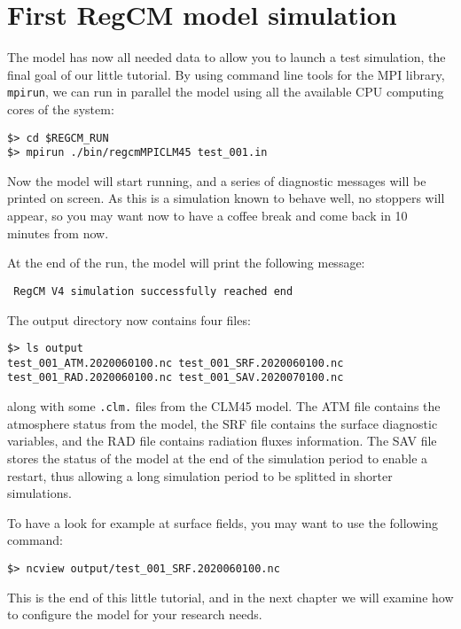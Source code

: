 \section{First RegCM model simulation}

The model has now all needed data to allow you to launch a test simulation,
the final goal of our little tutorial. By using command line tools for the
MPI library, \verb=mpirun=, we can run in parallel the model using all the
available CPU computing cores of the system:

\begin{Verbatim}
$> cd $REGCM_RUN
$> mpirun ./bin/regcmMPICLM45 test_001.in
\end{Verbatim}

Now the model will start running, and a series of diagnostic messages will be
printed on screen. As this is a simulation known to behave well, no stoppers
will appear, so you may want now to have a coffee break and come back in 10
minutes from now.

At the end of the run, the model will print the following message:

\begin{Verbatim}
 RegCM V4 simulation successfully reached end
\end{Verbatim}

The output directory now contains four files:

\begin{Verbatim}
$> ls output
test_001_ATM.2020060100.nc test_001_SRF.2020060100.nc
test_001_RAD.2020060100.nc test_001_SAV.2020070100.nc
\end{Verbatim}

along with some \verb=.clm.= files from the CLM45 model.
The ATM file contains the atmosphere status from the model, the SRF file
contains the surface diagnostic variables, and the RAD file contains radiation
fluxes information. The SAV file stores the status of the model at the end of
the simulation period to enable a restart, thus allowing a long simulation
period to be splitted in shorter simulations.

To have a look for example at surface fields, you may want to use the
following command:

\begin{Verbatim}
$> ncview output/test_001_SRF.2020060100.nc
\end{Verbatim}

This is the end of this little tutorial, and in the next chapter we will
examine how to configure the model for your research needs.
